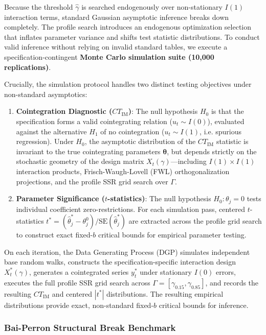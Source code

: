 Because the threshold $\hat{\gamma}$ is searched endogenously over non-stationary $I(1)$ interaction terms, standard Gaussian asymptotic inference breaks down completely. The profile search introduces an endogenous optimization selection that inflates parameter variance and shifts test statistic distributions. To conduct valid inference without relying on invalid standard tables, we execute a specification-contingent \textbf{Monte Carlo simulation suite (10,000 replications)}.

Crucially, the simulation protocol handles two distinct testing objectives under non-standard asymptotics:
\begin{enumerate}
    \item \textbf{Cointegration Diagnostic ($CT_{\text{IM}}$)}: The null hypothesis $H_0$ is that the specification forms a valid cointegrating relation ($u_t \sim I(0)$), evaluated against the alternative $H_1$ of no cointegration ($u_t \sim I(1)$, i.e. spurious regression). Under $H_0$, the asymptotic distribution of the $CT_{\text{IM}}$ statistic is invariant to the true cointegrating parameters $\boldsymbol{\theta}$, but depends strictly on the stochastic geometry of the design matrix $X_t(\gamma)$---including $I(1) \times I(1)$ interaction products, Frisch-Waugh-Lovell (FWL) orthogonalization projections, and the profile SSR grid search over $\Gamma$.
    \item \textbf{Parameter Significance ($t$-statistics)}: The null hypothesis $H_0: \theta_j = 0$ tests individual coefficient zero-restrictions. For each simulation pass, centered $t$-statistics $t^* = (\hat{\theta}_j^* - \theta_j^0) / \text{SE}(\hat{\theta}_j^*)$ are extracted across the profile grid search to construct exact fixed-$b$ critical bounds for empirical parameter testing.
\end{enumerate}

On each iteration, the Data Generating Process (DGP) simulates independent base random walks, constructs the specification-specific interaction design $X_t^*(\gamma)$, generates a cointegrated series $y_t^*$ under stationary $I(0)$ errors, executes the full profile SSR grid search across $\Gamma = [\gamma_{0.15}, \gamma_{0.85}]$, and records the resulting $CT_{\text{IM}}$ and centered $|t^*|$ distributions. The resulting empirical distributions provide exact, non-standard fixed-$b$ critical bounds for inference.

\subsubsection{Bai-Perron Structural Break Benchmark}

